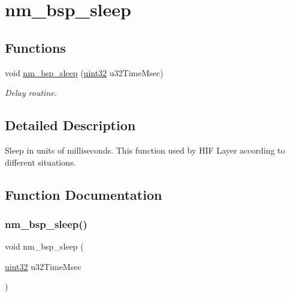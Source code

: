 \hypertarget{group__NmBspSleepFn}{}\section{nm\+\_\+bsp\+\_\+sleep}
\label{group__NmBspSleepFn}
\subsection*{Functions}
\begin{DoxyCompactItemize}
\item 
void \hyperlink{group__NmBspSleepFn_gadbf38ddf0138d8e0a4e4720909a7b081}{nm\+\_\+bsp\+\_\+sleep} (\hyperlink{group__DataT_ga100e7c691a47d6978527c479a0158245}{uint32} u32\+Time\+Msec)
\begin{DoxyCompactList}\small\item\em Delay routine. \end{DoxyCompactList}\end{DoxyCompactItemize}


\subsection{Detailed Description}
Sleep in units of milliseconds. This function used by H\+IF Layer according to different situations. 

\subsection{Function Documentation}
\mbox{\label{group__NmBspSleepFn_gadbf38ddf0138d8e0a4e4720909a7b081}} 
\subsubsection{\texorpdfstring{nm\+\_\+bsp\+\_\+sleep()}{nm\_bsp\_sleep()}}
{\footnotesize\ttfamily void nm\+\_\+bsp\+\_\+sleep (\begin{DoxyParamCaption}\item[{\hyperlink{group__DataT_ga100e7c691a47d6978527c479a0158245}{uint32}}]{u32\+Time\+Msec }\end{DoxyParamCaption})}



